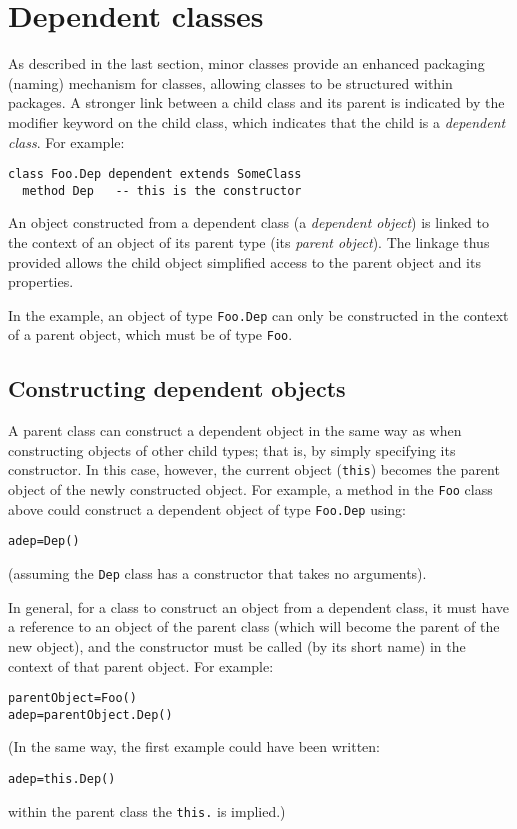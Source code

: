 \section{Dependent classes}\label{refsdepen}
\index{,}
\index{,}
\index{,}
 
As described in the last section, minor classes provide an enhanced
packaging (naming) mechanism for classes, allowing classes to be
structured within packages.  A stronger link between a child class and
its parent is indicated by the modifier keyword  on the
child class, which indicates that the child is a \emph{dependent class}.
For example:
\begin{lstlisting}
class Foo.Dep dependent extends SomeClass
  method Dep   -- this is the constructor
\end{lstlisting}
 
An object constructed from a dependent class (a \emph{dependent
object}) is linked to the context of an object of its parent
type (its \emph{parent object}).
The linkage thus provided allows the child object simplified access to
the parent object and its properties.
 
In the example, an object of type \texttt{Foo.Dep} can only be constructed
in the context of a parent object, which must be of type \texttt{Foo}.
\subsection{Constructing dependent objects}
 
A parent class can construct a dependent object in the same way as when
constructing objects of other child types; that is, by simply specifying
its constructor.  In this case, however, the current object
(\texttt{this}) becomes the parent object of the newly constructed object.
For example, a method in the \texttt{Foo} class above could construct a
dependent object of type \texttt{Foo.Dep} using:
\begin{lstlisting}
adep=Dep()
\end{lstlisting}
(assuming the \texttt{Dep} class has a constructor that takes no
arguments).
 
In general, for a class to construct an object from a dependent class,
it must have a reference to an object of the parent class (which will
become the parent of the new object), and the constructor must be called
(by its short name) in the context of that parent object.  For example:
\begin{lstlisting}
parentObject=Foo()
adep=parentObject.Dep()
\end{lstlisting}
(In the same way, the first example could have been written:
\begin{lstlisting}
adep=this.Dep()
\end{lstlisting}
within the parent class the \texttt{this.} is implied.)
 
